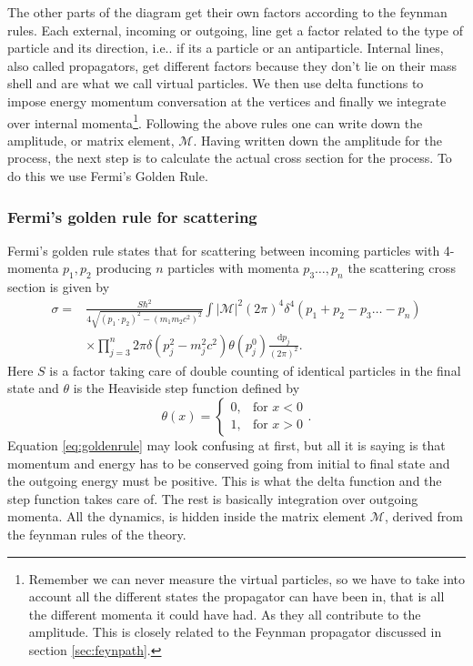 The other parts of the diagram get their own factors according to the feynman rules. Each external, incoming or outgoing, line get a factor related to the type of particle and its direction, i.e.. if its a particle or an antiparticle. Internal lines, also called propagators, get different factors because they don't lie on their mass shell and are what we call virtual particles. We then use delta functions to impose energy momentum conversation at the vertices and finally we integrate over internal momenta\footnote{Remember we can never measure the virtual particles, so we have to take into account all the different states the propagator can have been in, that is all the different momenta it could have had. As they all contribute to the amplitude. This is closely related to the Feynman propagator discussed in section \ref{sec:feynpath}.}. Following the above rules one can write down the amplitude, or matrix element, $\mathcal{M}$. Having written down the amplitude for the process, the next step is to calculate the actual cross section for the process. To do this we use Fermi's Golden Rule.
% 
\subsubsection{Fermi's golden rule for scattering}
Fermi's golden rule states that for scattering between incoming particles with 4-momenta $p_1, p_2$ producing $n$ particles with momenta $p_3 \dots , p_n$ the scattering cross section is given by\cite{griffiths1987iep}
\begin{align} \label{eq:goldenrule}
	\sigma = &\frac{S\hbar^2}{4\sqrt{(p_1 \cdot p_2)^2 - (m_1 m_2 c^2)^2}} \int |\mathcal{M}|^2 (2 \pi)^4 \delta^4(p_1+p_2-p_3 \dots -p_n) \nonumber \\
	&\times \prod_{j=3}^n 2\pi \delta(p_j^2 - m_j^2c^2)\theta(p_j^0) \frac{\textrm{d}p_j}{(2\pi)^2}.
\end{align}
Here $S$ is a factor taking care of double counting of identical particles in the final state and $\theta$ is the Heaviside step function defined by
\begin{equation}
	 \theta(x) = 
	\begin{cases} 
	  0,  & \mbox{for }x < 0 \\
	  1,  & \mbox{for }x > 0 
	\end{cases}.
\end{equation}
Equation \eqref{eq:goldenrule} may look confusing at first, but all it is saying is that momentum and energy has to be conserved going from initial to final state and the outgoing energy must be positive. This is what the delta function and the step function takes care of. The rest is basically integration over outgoing momenta. All the dynamics, is hidden inside the matrix element $\mathcal{M}$, derived from the feynman rules of the theory.

